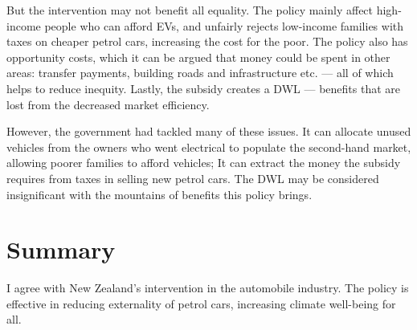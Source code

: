 \documentclass[a4paper,12pt]{article}
\begin{document}
But the intervention may not benefit all equality. The policy mainly affect high-income people who can afford EVs, and unfairly rejects low-income families with taxes on cheaper petrol cars, increasing the cost for the poor. The policy also has opportunity costs, which it can be argued that money could be spent in other areas: transfer payments, building roads and infrastructure etc. --- all of which helps to reduce inequity. Lastly, the subsidy creates a DWL  --- benefits that are lost from the decreased market efficiency.

However, the government had tackled many of these issues. It can allocate unused vehicles from the owners who went electrical to populate the second-hand market, allowing poorer families to afford vehicles; It can extract the money the subsidy requires from taxes in selling new petrol cars. The DWL may be considered insignificant with the mountains of benefits this policy brings.

\section*{Summary}
I agree with New Zealand's intervention in the automobile industry. The policy is effective in reducing externality of petrol cars, increasing climate well-being for all.
\end{document}

